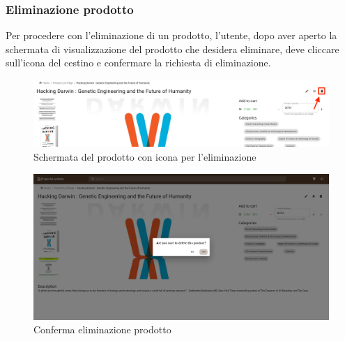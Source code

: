 \subsubsection{Eliminazione prodotto}
Per procedere con l'eliminazione di un prodotto, l'utente, dopo aver aperto la schermata di visualizzazione del prodotto che desidera eliminare, deve cliccare sull'icona del cestino e confermare la richiesta di eliminazione.
\begin{figure}[H]
	\centering
	\includegraphics[scale=0.25]{Immagini/Venditore/pdp.sellerdelete.png}
	\caption{Schermata del prodotto con icona per l'eliminazione}
	\label{fig:EliminaP}
\end{figure}
\begin{figure}[H]
	\centering
	\includegraphics[scale=0.25]{Immagini/Venditore/pdp-remove.seller.png}
	\caption{Conferma eliminazione prodotto}
	\label{fig:EliminazioneProdotto}
\end{figure}

